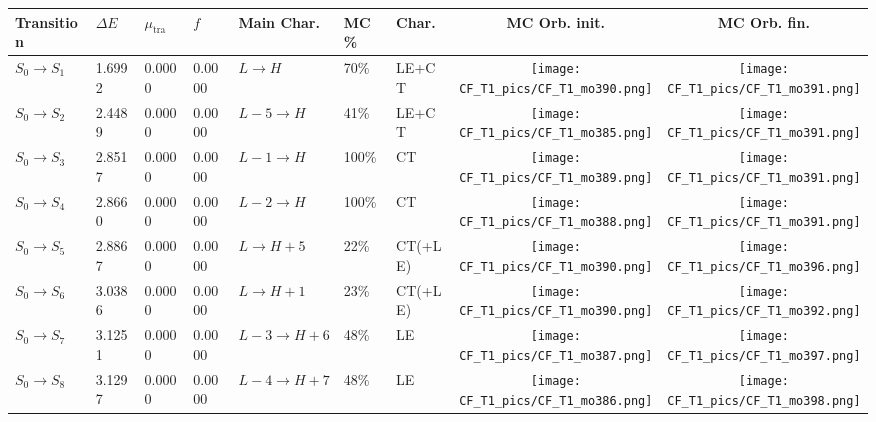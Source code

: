 \documentclass[9pt]{scrartcl}
\begin{document}
\begin{tabular}{l|lll|lllcc}
Transition & $\Delta E$ & $\mu_\mathrm{tra}$ & $f$ & Main Char. & MC \% & Char. & MC Orb. init. & MC Orb. fin.\\\hline
$S_0 \rightarrow S_{1} $       & 1.6992     & 0.0000     & 0.0000     & $L \rightarrow H$              & 70\%       & LE+CT      & \texttt{[image: CF\_T1\_pics/CF\_T1\_mo390.png]} & \texttt{[image: CF\_T1\_pics/CF\_T1\_mo391.png]}\\\hline
$S_0 \rightarrow S_{2} $       & 2.4489     & 0.0000     & 0.0000     & $L-5 \rightarrow H$            & 41\%       & LE+CT      & \texttt{[image: CF\_T1\_pics/CF\_T1\_mo385.png]} & \texttt{[image: CF\_T1\_pics/CF\_T1\_mo391.png]}\\\hline
$S_0 \rightarrow S_{3} $       & 2.8517     & 0.0000     & 0.0000     & $L-1 \rightarrow H$            & 100\%      & CT         & \texttt{[image: CF\_T1\_pics/CF\_T1\_mo389.png]} & \texttt{[image: CF\_T1\_pics/CF\_T1\_mo391.png]}\\\hline
$S_0 \rightarrow S_{4} $       & 2.8660     & 0.0000     & 0.0000     & $L-2 \rightarrow H$            & 100\%      & CT         & \texttt{[image: CF\_T1\_pics/CF\_T1\_mo388.png]} & \texttt{[image: CF\_T1\_pics/CF\_T1\_mo391.png]}\\\hline
$S_0 \rightarrow S_{5} $       & 2.8867     & 0.0000     & 0.0000     & $L \rightarrow H+5$            & 22\%       & CT(+LE)    & \texttt{[image: CF\_T1\_pics/CF\_T1\_mo390.png]} & \texttt{[image: CF\_T1\_pics/CF\_T1\_mo396.png]}\\\hline
$S_0 \rightarrow S_{6} $       & 3.0386     & 0.0000     & 0.0000     & $L \rightarrow H+1$            & 23\%       & CT(+LE)    & \texttt{[image: CF\_T1\_pics/CF\_T1\_mo390.png]} & \texttt{[image: CF\_T1\_pics/CF\_T1\_mo392.png]}\\\hline
$S_0 \rightarrow S_{7} $       & 3.1251     & 0.0000     & 0.0000     & $L-3 \rightarrow H+6$          & 48\%       & LE         & \texttt{[image: CF\_T1\_pics/CF\_T1\_mo387.png]} & \texttt{[image: CF\_T1\_pics/CF\_T1\_mo397.png]}\\\hline
$S_0 \rightarrow S_{8} $       & 3.1297     & 0.0000     & 0.0000     & $L-4 \rightarrow H+7$          & 48\%       & LE         & \texttt{[image: CF\_T1\_pics/CF\_T1\_mo386.png]} & \texttt{[image: CF\_T1\_pics/CF\_T1\_mo398.png]}\\\hline

\end{tabular}
\end{document}

